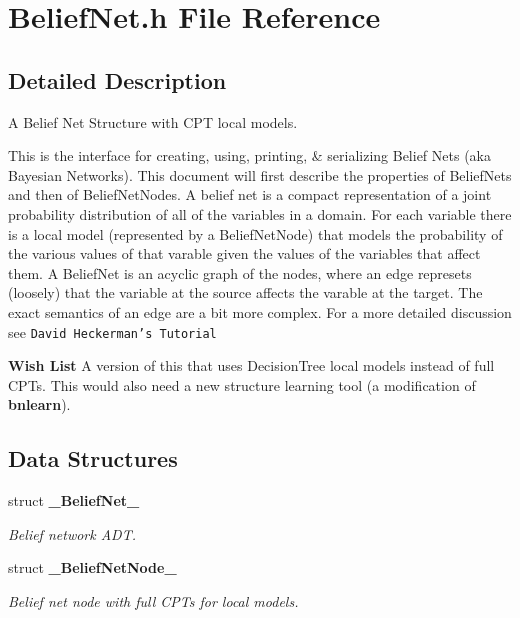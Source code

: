\section{Belief\-Net.h File Reference}
\label{BeliefNet_8h}


\subsection{Detailed Description}
A Belief Net Structure with CPT local models. 

This is the interface for creating, using, printing, \& serializing Belief Nets (aka Bayesian Networks). This document will first describe the properties of Belief\-Nets and then of Belief\-Net\-Nodes. A belief net is a compact representation of a joint probability distribution of all of the variables in a domain. For each variable there is a local model (represented by a Belief\-Net\-Node) that models the probability of the various values of that varable given the values of the variables that affect them. A Belief\-Net is an acyclic graph of the nodes, where an edge represets (loosely) that the variable at the source affects the varable at the target. The exact semantics of an edge are a bit more complex. For a more detailed discussion see {\tt David Heckerman's Tutorial}

\begin{Desc}
\item[{\bf Wish List}]A version of this that uses Decision\-Tree local models instead of full CPTs. This would also need a new structure learning tool (a modification of {\bf bnlearn}). \end{Desc}


\subsection*{Data Structures}
\begin{CompactItemize}
\item 
struct {\bf \_\-Belief\-Net\_\-}
\begin{CompactList}\small\item\em Belief network ADT. \item\end{CompactList}\item 
struct {\bf \_\-Belief\-Net\-Node\_\-}
\begin{CompactList}\small\item\em Belief net node with full CPTs for local models. \item\end{CompactList}\end{CompactItemize}
